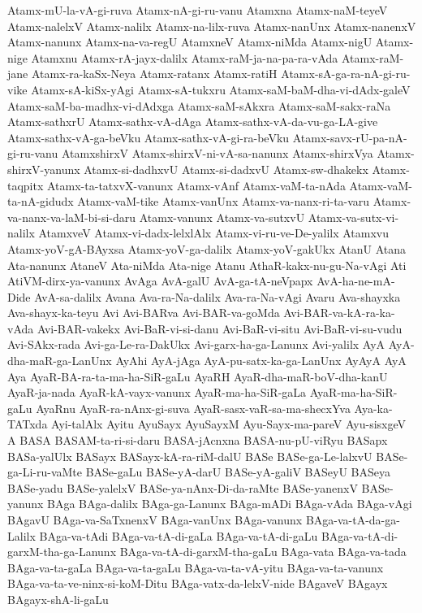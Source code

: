{Atamx-mU-la-vA-gi-ruva
Atamx-nA-gi-ru-vanu
Atamxna
Atamx-naM-teyeV
Atamx-nalelxV
Atamx-nalilx
Atamx-na-lilx-ruva
Atamx-nanUnx
Atamx-nanenxV
Atamx-nanunx
Atamx-na-va-regU
AtamxneV
Atamx-niMda
Atamx-nigU
Atamx-nige
Atamxnu
Atamx-rA-jayx-dalilx
Atamx-raM-ja-na-pa-ra-vAda
Atamx-raM-jane
Atamx-ra-kaSx-Neya
Atamx-ratanx
Atamx-ratiH
Atamx-sA-ga-ra-nA-gi-ru-vike
Atamx-sA-kiSx-yAgi
Atamx-sA-tukxru
Atamx-saM-baM-dha-vi-dAdx-galeV
Atamx-saM-ba-madhx-vi-dAdxga
Atamx-saM-sAkxra
Atamx-saM-sakx-raNa
Atamx-sathxrU
Atamx-sathx-vA-dAga
Atamx-sathx-vA-da-vu-ga-LA-give
Atamx-sathx-vA-ga-beVku
Atamx-sathx-vA-gi-ra-beVku
Atamx-savx-rU-pa-nA-gi-ru-vanu
AtamxshirxV
Atamx-shirxV-ni-vA-sa-nanunx
Atamx-shirxVya
Atamx-shirxV-yanunx
Atamx-si-dadhxvU
Atamx-si-dadxvU
Atamx-sw-dhakekx
Atamx-taqpitx
Atamx-ta-tatxvX-vanunx
Atamx-vAnf
Atamx-vaM-ta-nAda
Atamx-vaM-ta-nA-gidudx
Atamx-vaM-tike
Atamx-vanUnx
Atamx-va-nanx-ri-ta-varu
Atamx-va-nanx-va-laM-bi-si-daru
Atamx-vanunx
Atamx-va-sutxvU
Atamx-va-sutx-vi-nalilx
AtamxveV
Atamx-vi-dadx-lelxlAlx
Atamx-vi-ru-ve-De-yalilx
Atamxvu
Atamx-yoV-gA-BAyxsa
Atamx-yoV-ga-dalilx
Atamx-yoV-gakUkx
AtanU
Atana
Ata-nanunx
AtaneV
Ata-niMda
Ata-nige
Atanu
AthaR-kakx-nu-gu-Na-vAgi
Ati
AtiVM-dirx-ya-vanunx
AvAga
AvA-galU
AvA-ga-tA-neVpapx
AvA-ha-ne-mA-Dide
AvA-sa-dalilx
Avana
Ava-ra-Na-dalilx
Ava-ra-Na-vAgi
Avaru
Ava-shayxka
Ava-shayx-ka-teyu
Avi
Avi-BARva
Avi-BAR-va-goMda
Avi-BAR-va-kA-ra-ka-vAda
Avi-BAR-vakekx
Avi-BaR-vi-si-danu
Avi-BaR-vi-situ
Avi-BaR-vi-su-vudu
Avi-SAkx-rada
Avi-ga-Le-ra-DakUkx
Avi-garx-ha-ga-Lanunx
Avi-yalilx
AyA
AyA-dha-maR-ga-LanUnx
AyAhi
AyA-jAga
AyA-pu-satx-ka-ga-LanUnx
AyAyA
AyA‌
Aya
AyaR-BA-ra-ta-ma-ha-SiR-gaLu
AyaRH
AyaR-dha-maR-boV-dha-kanU
AyaR-ja-nada
AyaR-kA-vayx-vanunx
AyaR-ma-ha-SiR-gaLa
AyaR-ma-ha-SiR-gaLu
AyaRnu
AyaR-ra-nAnx-gi-suva
AyaR-sasx-vaR-sa-ma-shecxYva
Aya-ka-TATxda
Ayi-talAlx
Ayitu
AyuSayx
AyuSayxM
Ayu-Sayx-ma-pareV
Ayu-sisxgeV
A‌
BASA
BASAM-ta-ri-si-daru
BASA-jAcnxna
BASA-nu-pU-viRyu
BASapx
BASa-yalUlx
BASayx
BASayx-kA-ra-riM-dalU
BASe
BASe-ga-Le-lalxvU
BASe-ga-Li-ru-vaMte
BASe-gaLu
BASe-yA-darU
BASe-yA-galiV
BASeyU
BASeya
BASe-yadu
BASe-yalelxV
BASe-ya-nAnx-Di-da-raMte
BASe-yanenxV
BASe-yanunx
BAga
BAga-dalilx
BAga-ga-Lanunx
BAga-mADi
BAga-vAda
BAga-vAgi
BAgavU
BAga-va-SaTxnenxV
BAga-vanUnx
BAga-vanunx
BAga-va-tA-da-ga-Lalilx
BAga-va-tAdi
BAga-va-tA-di-gaLa
BAga-va-tA-di-gaLu
BAga-va-tA-di-garxM-tha-ga-Lanunx
BAga-va-tA-di-garxM-tha-gaLu
BAga-vata
BAga-va-tada
BAga-va-ta-gaLa
BAga-va-ta-gaLu
BAga-va-ta-vA-yitu
BAga-va-ta-vanunx
BAga-va-ta-ve-ninx-si-koM-Ditu
BAga-vatx-da-lelxV-nide
BAgaveV
BAgayx
BAgayx-shA-li-gaLu
}
